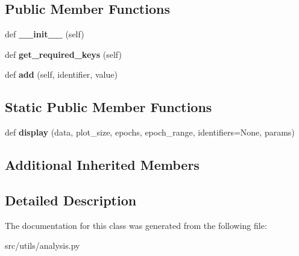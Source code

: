 \subsection*{Public Member Functions}
\begin{DoxyCompactItemize}
\item 
def {\bfseries \+\_\+\+\_\+init\+\_\+\+\_\+} (self)\hypertarget{classanalysis_1_1AttentionData_a5f53d61098b4771aea85433acd1b7bc4}{}\label{classanalysis_1_1AttentionData_a5f53d61098b4771aea85433acd1b7bc4}

\item 
def {\bfseries get\+\_\+required\+\_\+keys} (self)\hypertarget{classanalysis_1_1AttentionData_a0a9bf2709ad0a6be6d04ebc6f271d9fa}{}\label{classanalysis_1_1AttentionData_a0a9bf2709ad0a6be6d04ebc6f271d9fa}

\item 
def {\bfseries add} (self, identifier, value)\hypertarget{classanalysis_1_1AttentionData_a3140fc99e83d19bf7cb6c563330a51e1}{}\label{classanalysis_1_1AttentionData_a3140fc99e83d19bf7cb6c563330a51e1}

\end{DoxyCompactItemize}
\subsection*{Static Public Member Functions}
\begin{DoxyCompactItemize}
\item 
def {\bfseries display} (data, plot\+\_\+size, epochs, epoch\+\_\+range, identifiers=None, params)\hypertarget{classanalysis_1_1AttentionData_a18bd9c557c02f1edf07b928d37bbce40}{}\label{classanalysis_1_1AttentionData_a18bd9c557c02f1edf07b928d37bbce40}

\end{DoxyCompactItemize}
\subsection*{Additional Inherited Members}


\subsection{Detailed Description}
\begin{DoxyVerb}\end{DoxyVerb}
 

The documentation for this class was generated from the following file\+:\begin{DoxyCompactItemize}
\item 
src/utils/analysis.\+py\end{DoxyCompactItemize}
